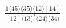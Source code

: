 \documentclass[varwidth, border=5pt]{standalone}
\begin{document}
\begin{my}
$\begin{gathered}
\scriptscriptstyle\frac{1⟨45⟩⟨35⟩⟨12⟩[14]}{[12]⟨13⟩^2⟨24⟩⟨34⟩}
\end{gathered}$
\end{my}
\end{document}
